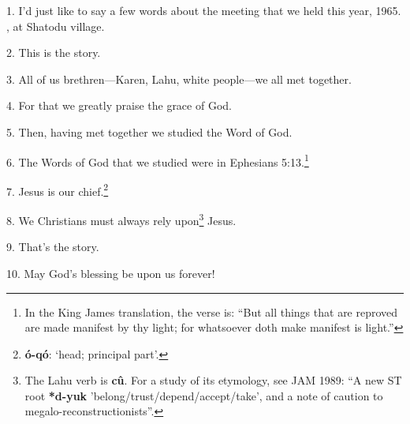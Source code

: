 \setcounter{footnote}{0}

1. I'd just like to say a few words about the meeting that we held this year,
1965. , at Shatodu village.

2. This is the story.

3. All of us brethren---Karen, Lahu, white people---we all met together.

4. For that we greatly praise the grace of God.

5. Then, having met together we studied the Word of God.

6. The Words of God that we studied were in Ephesians 5:13.\footnote{In the King James translation, the verse is: ``But all things that are reproved are made manifest by thy light; for whatsoever doth make manifest is light.''}

7. Jesus is our chief.\footnote{\textbf{ó-qó}: `head; principal part'.}

8. We Christians must always rely upon\footnote{The Lahu verb is \textbf{cû}. For a study of its etymology, see JAM 1989: ``A new ST root \textbf{*d-yuk }'belong/trust/depend/accept/take', and a note of caution to megalo-reconstructionists''.} Jesus.

9. That's the story.

10. May God's blessing be upon us forever!

